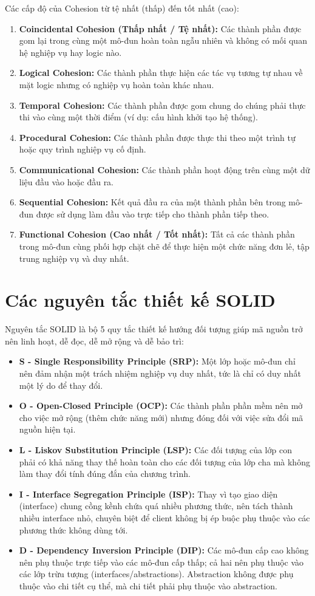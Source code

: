 \documentclass[12pt,a4paper]{article}
\begin{document}
Các cấp độ của Cohesion từ tệ nhất (thấp) đến tốt nhất (cao):
\begin{enumerate}
    \item \textbf{Coincidental Cohesion (Thấp nhất / Tệ nhất):} Các thành phần được gom lại trong cùng một mô-đun hoàn toàn ngẫu nhiên và không có mối quan hệ nghiệp vụ hay logic nào.
    \item \textbf{Logical Cohesion:} Các thành phần thực hiện các tác vụ tương tự nhau về mặt logic nhưng có nghiệp vụ hoàn toàn khác nhau.
    \item \textbf{Temporal Cohesion:} Các thành phần được gom chung do chúng phải thực thi vào cùng một thời điểm (ví dụ: cấu hình khởi tạo hệ thống).
    \item \textbf{Procedural Cohesion:} Các thành phần được thực thi theo một trình tự hoặc quy trình nghiệp vụ cố định.
    \item \textbf{Communicational Cohesion:} Các thành phần hoạt động trên cùng một dữ liệu đầu vào hoặc đầu ra.
    \item \textbf{Sequential Cohesion:} Kết quả đầu ra của một thành phần bên trong mô-đun được sử dụng làm đầu vào trực tiếp cho thành phần tiếp theo.
    \item \textbf{Functional Cohesion (Cao nhất / Tốt nhất):} Tất cả các thành phần trong mô-đun cùng phối hợp chặt chẽ để thực hiện một chức năng đơn lẻ, tập trung nghiệp vụ và duy nhất.
\end{enumerate}

\section{Các nguyên tắc thiết kế SOLID}
Nguyên tắc SOLID là bộ 5 quy tắc thiết kế hướng đối tượng giúp mã nguồn trở nên linh hoạt, dễ đọc, dễ mở rộng và dễ bảo trì:
\begin{itemize}
    \item \textbf{S - Single Responsibility Principle (SRP):} Một lớp hoặc mô-đun chỉ nên đảm nhận một trách nhiệm nghiệp vụ duy nhất, tức là chỉ có duy nhất một lý do để thay đổi.
    \item \textbf{O - Open-Closed Principle (OCP):} Các thành phần phần mềm nên mở cho việc mở rộng (thêm chức năng mới) nhưng đóng đối với việc sửa đổi mã nguồn hiện tại.
    \item \textbf{L - Liskov Substitution Principle (LSP):} Các đối tượng của lớp con phải có khả năng thay thế hoàn toàn cho các đối tượng của lớp cha mà không làm thay đổi tính đúng đắn của chương trình.
    \item \textbf{I - Interface Segregation Principle (ISP):} Thay vì tạo giao diện (interface) chung cồng kềnh chứa quá nhiều phương thức, nên tách thành nhiều interface nhỏ, chuyên biệt để client không bị ép buộc phụ thuộc vào các phương thức không dùng tới.
    \item \textbf{D - Dependency Inversion Principle (DIP):} Các mô-đun cấp cao không nên phụ thuộc trực tiếp vào các mô-đun cấp thấp; cả hai nên phụ thuộc vào các lớp trừu tượng (interfaces/abstractions). Abstraction không được phụ thuộc vào chi tiết cụ thể, mà chi tiết phải phụ thuộc vào abstraction.
\end{itemize}
\end{document}
